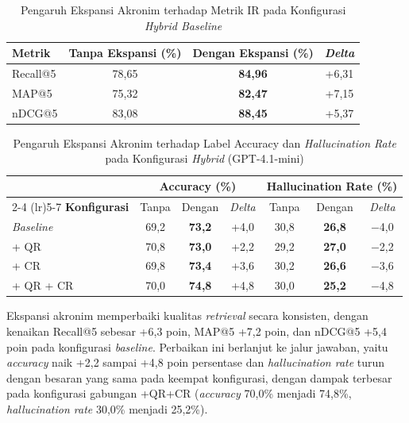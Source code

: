 \begin{table}[H]
\centering
\caption{Pengaruh Ekspansi Akronim terhadap Metrik IR pada Konfigurasi \textit{Hybrid Baseline}}
\label{tbl:retrieval-metrics}
\begin{tabular}{lccc}
\toprule
\textbf{Metrik} & \textbf{Tanpa Ekspansi (\%)} & \textbf{Dengan Ekspansi (\%)} & \textbf{\textit{Delta}} \\
\midrule
Recall@5 & 78{,}65 & \textbf{84{,}96} & +6{,}31 \\
MAP@5    & 75{,}32 & \textbf{82{,}47} & +7{,}15 \\
nDCG@5   & 83{,}08 & \textbf{88{,}45} & +5{,}37 \\
\bottomrule
\end{tabular}
\end{table}

\begin{table}[H]
\centering
\small
\setlength{\tabcolsep}{6pt}
\caption{Pengaruh Ekspansi Akronim terhadap Label Accuracy dan \textit{Hallucination Rate} pada Konfigurasi \textit{Hybrid} (GPT-4.1-mini)}
\label{tbl:efek-sh}
\begin{tabular}{lcccccc}
\toprule
& \multicolumn{3}{c}{\textbf{Accuracy (\%)}} & \multicolumn{3}{c}{\textbf{Hallucination Rate (\%)}} \\
\cmidrule(lr){2-4} \cmidrule(lr){5-7}
\textbf{Konfigurasi} & Tanpa & Dengan & \textit{Delta} & Tanpa & Dengan & \textit{Delta} \\
\midrule
\textit{Baseline} & 69{,}2 & \textbf{73{,}2} & +4{,}0 & 30{,}8 & \textbf{26{,}8} & $-$4{,}0 \\
+ QR              & 70{,}8 & \textbf{73{,}0} & +2{,}2 & 29{,}2 & \textbf{27{,}0} & $-$2{,}2 \\
+ CR              & 69{,}8 & \textbf{73{,}4} & +3{,}6 & 30{,}2 & \textbf{26{,}6} & $-$3{,}6 \\
+ QR + CR         & 70{,}0 & \textbf{74{,}8} & +4{,}8 & 30{,}0 & \textbf{25{,}2} & $-$4{,}8 \\
\bottomrule
\end{tabular}
\end{table}

Ekspansi akronim memperbaiki kualitas \textit{retrieval} secara konsisten, dengan kenaikan Recall@5 sebesar +6{,}3 poin, MAP@5 +7{,}2 poin, dan nDCG@5 +5{,}4 poin pada konfigurasi \textit{baseline}. Perbaikan ini berlanjut ke jalur jawaban, yaitu \textit{accuracy} naik +2{,}2 sampai +4{,}8 poin persentase dan \textit{hallucination rate} turun dengan besaran yang sama pada keempat konfigurasi, dengan dampak terbesar pada konfigurasi gabungan +QR+CR (\textit{accuracy} 70{,}0\% menjadi 74{,}8\%, \textit{hallucination rate} 30{,}0\% menjadi 25{,}2\%).

